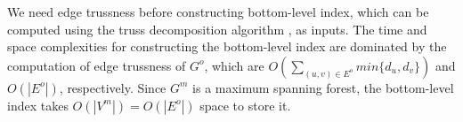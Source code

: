 We need edge trussness before constructing bottom-level index, which can be computed using the truss decomposition algorithm \cite{wang2012truss}, as inputs. The time and space complexities for constructing the bottom-level index are dominated by the computation of edge trussness of $G^o$, which are $O(\sum_{(u,v) \in E^{o}}{min\{d_{u},d_{v}\}})$ and $O(|E^{o}|)$,  respectively. Since $G^m$ is a maximum spanning forest, the bottom-level index takes $O(|V^{m}|) = O(|E^{o}|)$ space to store it.

\subsubsection{\TreeIndex{}}
\label{top-level}

